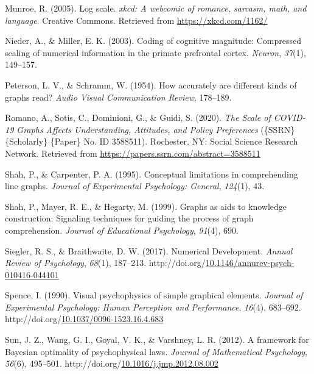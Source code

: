 \documentclass[print]{nuthesis}
\newlength{\cslhangindent}
\newenvironment{CSLReferences}%
{\setlength{\parindent}{0pt}%
\everypar{\setlength{\hangindent}{\cslhangindent}}\ignorespaces}%
{\par}
\begin{document}
\begin{CSLReferences}{1}{0}
\leavevmode\hypertarget{ref-munroe_2005}{}%
Munroe, R. (2005). Log scale. \emph{xkcd: A webcomic of romance, sarcasm, math, and language}. Creative Commons. Retrieved from \url{https://xkcd.com/1162/}

\leavevmode\hypertarget{ref-nieder2003coding}{}%
Nieder, A., \& Miller, E. K. (2003). Coding of cognitive magnitude: Compressed scaling of numerical information in the primate prefrontal cortex. \emph{Neuron}, \emph{37}(1), 149--157.

\leavevmode\hypertarget{ref-peterson1954accurately}{}%
Peterson, L. V., \& Schramm, W. (1954). How accurately are different kinds of graphs read? \emph{Audio Visual Communication Review}, 178--189.

\leavevmode\hypertarget{ref-romano_scale_2020}{}%
Romano, A., Sotis, C., Dominioni, G., \& Guidi, S. (2020). \emph{The {Scale} of {COVID}-19 {Graphs} {Affects} {Understanding}, {Attitudes}, and {Policy} {Preferences}} (\{SSRN\} \{Scholarly\} \{Paper\} No. ID 3588511). Rochester, NY: Social Science Research Network. Retrieved from \url{https://papers.ssrn.com/abstract=3588511}

\leavevmode\hypertarget{ref-shah1995conceptual}{}%
Shah, P., \& Carpenter, P. A. (1995). Conceptual limitations in comprehending line graphs. \emph{Journal of Experimental Psychology: General}, \emph{124}(1), 43.

\leavevmode\hypertarget{ref-shah1999graphs}{}%
Shah, P., Mayer, R. E., \& Hegarty, M. (1999). Graphs as aids to knowledge construction: Signaling techniques for guiding the process of graph comprehension. \emph{Journal of Educational Psychology}, \emph{91}(4), 690.

\leavevmode\hypertarget{ref-siegler_numerical_2017}{}%
Siegler, R. S., \& Braithwaite, D. W. (2017). Numerical {Development}. \emph{Annual Review of Psychology}, \emph{68}(1), 187--213. http://doi.org/\href{https://doi.org/10.1146/annurev-psych-010416-044101}{10.1146/annurev-psych-010416-044101}

\leavevmode\hypertarget{ref-spence_visual_1990}{}%
Spence, I. (1990). Visual psychophysics of simple graphical elements. \emph{Journal of Experimental Psychology: Human Perception and Performance}, \emph{16}(4), 683--692. http://doi.org/\href{https://doi.org/10.1037/0096-1523.16.4.683}{10.1037/0096-1523.16.4.683}

\leavevmode\hypertarget{ref-sun_framework_2012}{}%
Sun, J. Z., Wang, G. I., Goyal, V. K., \& Varshney, L. R. (2012). A framework for {Bayesian} optimality of psychophysical laws. \emph{Journal of Mathematical Psychology}, \emph{56}(6), 495--501. http://doi.org/\href{https://doi.org/10.1016/j.jmp.2012.08.002}{10.1016/j.jmp.2012.08.002}


\end{CSLReferences}
\end{document}
